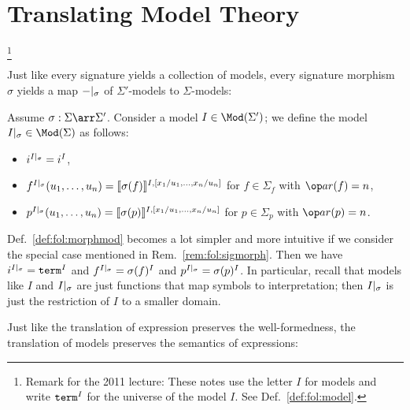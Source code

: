 \section{Translating Model Theory}

\footnote{Remark for the 2011 lecture: These notes use the letter $I$ for models and write $\mathtt{term}^I$ for the universe of the model $I$. See Def.~\ref{def:fol:model}.}

Just like every signature yields a collection of models, every signature morphism $\sigma$ yields a map $-|_{\sigma}$ of $\Sigma'$-models to $\Sigma$-models:

\begin{definition}\label{def:fol:morphmod}
Assume $\sigma:\Sigma\arr\Sigma'$. Consider a model $I\in\Mod(\Sigma')$; we define the model $\reduce{\sigma}{I}\in\Mod(\Sigma)$ as follows:
\begin{itemize}
\item $i^{I|_{\sigma}}=i^{I}$,
\item $f^{I|_{\sigma}}(u_1,\ldots,u_n)=\llbracket \sigma(f)\rrbracket^{I,[x_1/u_1,\ldots,x_n/u_n]}$ for $f\in\Sigma_f$ with $\arit(f)=n$,
\item $p^{I|_{\sigma}}(u_1,\ldots,u_n)=\llbracket \sigma(p)\rrbracket^{I,[x_1/u_1,\ldots,x_n/u_n]}$ for $p\in\Sigma_p$ with $\arit(p)=n$.
\end{itemize}
\end{definition}

\begin{remark}\label{rem:fol:modelmorph}
Def.~\ref{def:fol:morphmod} becomes a lot simpler and more intuitive if we consider the special case mentioned in Rem.~\ref{rem:fol:sigmorph}. Then we have $i^{I|_{\sigma}}=\mathtt{term}^I$ and $f^{I|_{\sigma}}=\sigma(f)^I$ and $p^{I|_{\sigma}}=\sigma(p)^I$. In particular, recall that models like  $I$ and $I|_{\sigma}$ are just functions that map symbols to interpretation; then $I|_{\sigma}$ is just the restriction of $I$ to a smaller domain.
\end{remark}

Just like the translation of expression preserves the well-formedness, the translation of models preserves the semantics of expressions:

